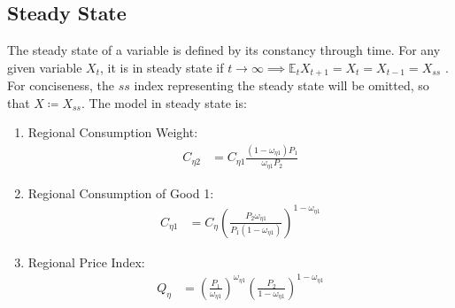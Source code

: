 \documentclass[../thesis.tex]{subfiles}
\begin{document}
\newpage


\subsection{Steady State}

The steady state of a variable is defined by its constancy through time. For any given variable $X_t$, it is in steady state if $t \to \infty \implies \mathbb{E}_t X_{t+1} = X_t = X_{t-1} = X_{ss}$ \cite[p.41]{costa_junior_understanding_2016}. For conciseness, the $ss$ index representing the steady state will be omitted, so that $X \coloneq X_{ss}$. The model in steady state is:

\begin{enumerate}
	
	\item Regional Consumption Weight:
	\begin{align}
		C_{\eta 2} &= C_{\eta 1} \frac{(1 - \omega_{\eta 1}) P_{1}}{\omega_{\eta 1} P_{2}} \label{eq_v2:reg-ss-C-eta-12-t}
	\end{align}
	
	\item Regional Consumption of Good 1:	
	\begin{align}
		C_{\eta 1} &= C_{\eta} \left( \frac{P_{2} \omega_{\eta 1}}{P_{1} (1 - \omega_{\eta 1})} \right)^{1-\omega_{\eta 1}} \label{eq_v2:reg-ss-C-eta-1-t}
	\end{align}
	
	\item Regional Price Index:
	\begin{align}
		Q_{\eta} &= \left( \frac{P_{1}}{\omega_{\eta 1}} \right)^{\omega_{\eta 1}} \left( \frac{P_{2}}{1 -\omega_{\eta 1}} \right)^{1 -\omega_{\eta  1}} \label{eq_v2:reg-ss-total-expense-level}
	\end{align}
	
	\begin{comment}
			\item Region 1 Price Index:
		\begin{align}
			Q_{1} &= \left( \frac{P_{1}}{\omega_{11}} \right)^{\omega_{11}} \left( \frac{P_{2}}{1 -\omega_{11}} \right)^{1 -\omega_{11}} \label{eq_v2:reg-ss-total-expense-level}
		\end{align}
		
		\item Regional Terms of Trade:
		\begin{align}
			\frac{Q_{1}}{Q_{2}} &= \frac{\omega_{21}^{\omega_{21}} (1 -\omega_{21})^{1 -\omega_{21}}}{\omega_{11}^{\omega_{11}} (1 - \omega_{11})^{1 - \omega_{11}}} \label{eq_v2:reg-ss-total-expense-level-2}
		\end{align}
	\end{comment}
	

\end{enumerate}
\end{document}
